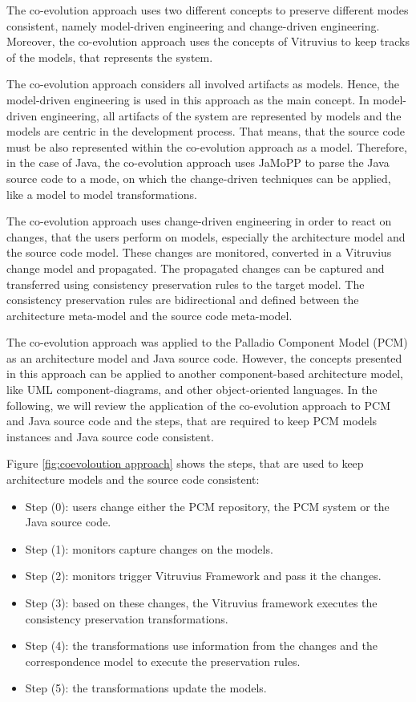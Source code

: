 The co-evolution approach uses two different concepts to preserve different modes consistent, namely model-driven engineering and change-driven engineering. Moreover, the co-evolution approach uses the concepts of Vitruvius to keep tracks of the models, that represents the system. 

The co-evolution approach considers all involved artifacts as models. Hence, the model-driven engineering is used in this approach as the main concept. In model-driven engineering, all artifacts of the system are represented by models and the models are centric in the development process. That means, that the source code must be also represented within the co-evolution approach as a model. Therefore, in the case of Java, the co-evolution approach uses JaMoPP to parse the Java source code to a mode, on which the change-driven techniques can be applied, like a model to model transformations.

The co-evolution approach uses change-driven engineering in order to react on changes, that the users perform on models, especially the architecture model and the source code model. These changes are monitored, converted in a Vitruvius change model and propagated. The propagated changes can be captured and transferred using consistency preservation rules to the target model. The consistency preservation rules are bidirectional and defined between the architecture meta-model and the source code meta-model.

The co-evolution approach was applied to the Palladio Component Model (PCM) as an architecture model and Java source code.  However, the concepts presented in this approach can be applied to another component-based architecture model, like UML component-diagrams, and other object-oriented languages. In the following, we will review the application of the co-evolution approach to PCM and Java source code and the steps, that are required to keep PCM models instances and Java source code consistent. 



Figure  \ref{fig:coevoloution approach} shows the steps, that are used to keep architecture models and the source code consistent:

\begin{itemize}
\item Step (0): users change either the PCM repository, the PCM system or the Java source code.  
\item Step (1): monitors capture changes on the models.
\item Step (2):  monitors trigger Vitruvius Framework and pass it the changes.
\item Step (3): based on these changes, the Vitruvius framework executes the consistency preservation transformations. 
\item Step (4): the transformations use information from the changes and the correspondence model to execute the preservation rules.
\item Step (5): the transformations update the models. 
\end{itemize}

